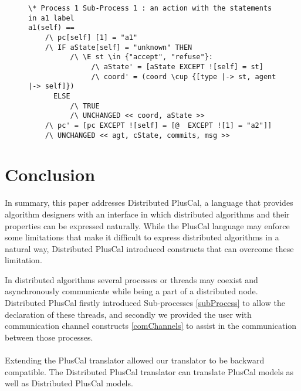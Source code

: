 \documentclass[journal]{IEEEtran}
\begin{document}
\begin{enumerate}
\begin{figure}[!h]
\begin{lstlisting}[frame = tlrb, numbers=none]
\* Process 1 Sub-Process 1 : an action with the statements in a1 label
a1(self) ==
    /\ pc[self] [1] = "a1"
    /\ IF aState[self] = "unknown" THEN 
          /\ \E st \in {"accept", "refuse"}:
               /\ aState' = [aState EXCEPT ![self] = st]
               /\ coord' = (coord \cup {[type |-> st, agent |-> self]})
      ELSE 
          /\ TRUE
          /\ UNCHANGED << coord, aState >>
    /\ pc' = [pc EXCEPT ![self] = [@  EXCEPT ![1] = "a2"]]
    /\ UNCHANGED << agt, cState, commits, msg >>
\end{lstlisting}
\end{figure}
\FloatBarrier

\end{enumerate}

\section{Conclusion}
In summary, this paper addresses Distributed PlusCal, a language that provides algorithm designers with an interface in which distributed algorithms and their properties can be expressed naturally. While the PlusCal language may enforce some limitations that make it difficult to express distributed algorithms in a natural way, Distributed PlusCal introduced constructs that can overcome these limitation.

In distributed algorithms several processes or threads may coexist and asynchronously communicate while being a part of a distributed node. Distributed PlusCal firstly introduced Sub-processes \ref{subProcess} to allow the declaration of these threads, and secondly we provided the user with communication channel constructs \ref{comChannels} to assist in the communication between those processes.
\\\\
Extending the PlusCal translator allowed our translator to be backward compatible. The Distributed PlusCal translator can translate PlusCal models as well as Distributed PlusCal models.
\end{document}
